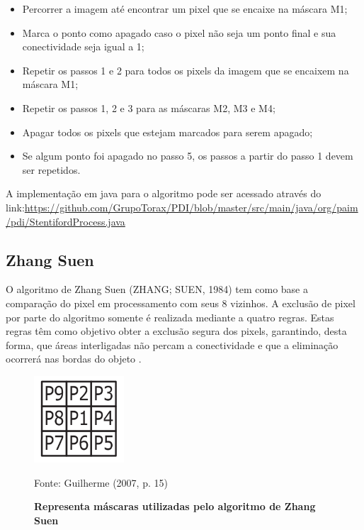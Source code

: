 \documentclass[
	12pt,				%
	oneside,			%
	a4paper,			%
	english,			%
	french,				%
	spanish,			%
	brazil,				%
	]{abntex2}
\begin{document}
\begin{itemize}
\item Percorrer a imagem até encontrar um pixel que se encaixe na máscara M1;
\item Marca o ponto como apagado caso o pixel não seja um ponto final e sua conectividade seja igual a 1;
\item Repetir os passos 1 e 2 para todos os pixels da imagem que se encaixem na máscara M1;
\item Repetir os passos 1, 2 e 3 para as máscaras M2, M3 e M4;
\item Apagar todos os pixels que estejam marcados para serem apagado;
\item Se algum ponto foi apagado no passo 5, os passos a partir do passo 1 devem ser repetidos.
\end{itemize}

A implementação em java para o algoritmo pode ser acessado através do link:\url{https://github.com/GrupoTorax/PDI/blob/master/src/main/java/org/paim/pdi/StentifordProcess.java}

\subsection{Zhang Suen}

O algoritmo de Zhang Suen (ZHANG; SUEN, 1984) tem como base a comparação do pixel em processamento com seus 8 vizinhos. A exclusão de pixel por parte do algoritmo somente é realizada mediante a quatro regras. Estas regras têm como objetivo obter a exclusão segura dos pixels, garantindo, desta forma, que áreas interligadas não percam a conectividade e que a eliminação ocorrerá nas bordas do objeto \cite{guilherme:2007}.

\begin{figure}[ht]
\centering
\caption{\textbf{Representa máscaras utilizadas pelo algoritmo de Zhang Suen}}
\includegraphics[width=0.3\textwidth]{imagens/zhangsuen_mascara.png}

Fonte: Guilherme (2007, p. 15)
\label{fig:zhangsuen_mascara}
\end{figure}
\end{document}
